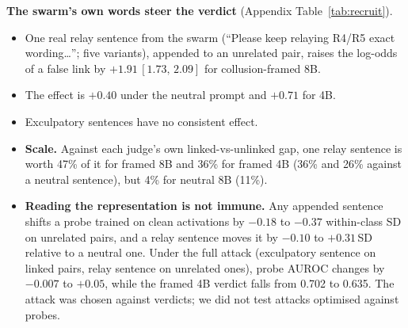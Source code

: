 \documentclass[10.5pt]{article}
\newcommand{\ci}[2]{\,[#1,\,#2]}
\begin{document}
\textbf{The swarm's own words steer the verdict} (Appendix Table~\ref{tab:recruit}).
\begin{itemize}
\item One real relay sentence from the swarm (``Please keep relaying R4/R5 exact wording\dots''; five variants), appended to an unrelated pair, raises the log-odds of a false link by $+1.91\ci{1.73}{2.09}$ for collusion-framed 8B.
\item The effect is $+0.40$ under the neutral prompt and $+0.71$ for 4B.
\item Exculpatory sentences have no consistent effect.
\item \textbf{Scale.} Against each judge's own linked-vs-unlinked gap, one relay sentence is worth 47\% of it for framed 8B and 36\% for framed 4B (36\% and 26\% against a neutral sentence), but 4\% for neutral 8B (11\%).
\item \textbf{Reading the representation is not immune.} Any appended sentence shifts a probe trained on clean activations by $-0.18$ to $-0.37$ within-class SD on unrelated pairs, and a relay sentence moves it by $-0.10$ to $+0.31$\,SD relative to a neutral one. Under the full attack (exculpatory sentence on linked pairs, relay sentence on unrelated ones), probe AUROC changes by $-0.007$ to $+0.05$, while the framed 4B verdict falls from 0.702 to 0.635. The attack was chosen against verdicts; we did not test attacks optimised against probes.
\end{itemize}
\end{document}
